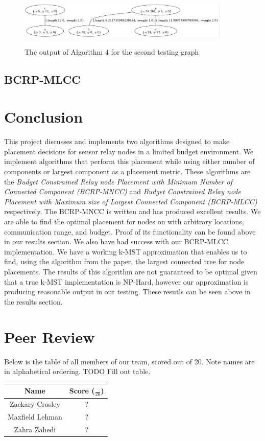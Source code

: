 \documentclass{article}
\begin{document}
\begin{figure}[h]
\centering
\includegraphics[width=0.9\textwidth]{examples/loc1_alg4.png}
\label{loc1-alg4}
\caption{The output of Algorithm 4 for the second testing graph}
\end{figure}

\subsection{BCRP-MLCC}



\section{Conclusion}
This project discusses and implements two algorithms designed to make placement decisions for sensor relay nodes in a limited budget environment.
We implement algorithms that perform this placement while using either number of components or largest component as a placement metric.
These algorithms are the \textit{Budget Constrained Relay node Placement with Minimum Number of Connected Component (BCRP-MNCC)} and \textit{Budget Constrained Relay node Placement with Maximum size of Largest Connected Component (BCRP-MLCC)} respectively.
The BCRP-MNCC is written and has produced excellent results.
We are able to find the optimal placement for nodes on with arbitrary locations, communication range, and budget.
Proof of its functionality can be found above in our results section.
We also have had success with our BCRP-MLCC implementation.
We have a working k-MST approximation that enables us to find, using the algorithm from the paper, the largest connected tree for node placements.
The results of this algorithm are not guaranteed to be optimal given that a true k-MST implementation is NP-Hard, however our approximation is producing reasonable output in our testing.
These resutls can be seen above in the results section.

\section{Peer Review}
Below is the table of all members of our team, scored out of 20.
Note names are in alphabetical ordering.
TODO Fill out table.
\begin{center}
  \begin{tabular}{|c|c|}
     \hline
  Name & Score ($\frac{}{20}$)\\
   \hline
  Zackary Crosley & ? \\
   \hline
  Maxfield Lehman & ?\\
   \hline
  Zahra Zahedi & ?\\
                  \hline
\end{tabular}
\end{center}
\end{document}
